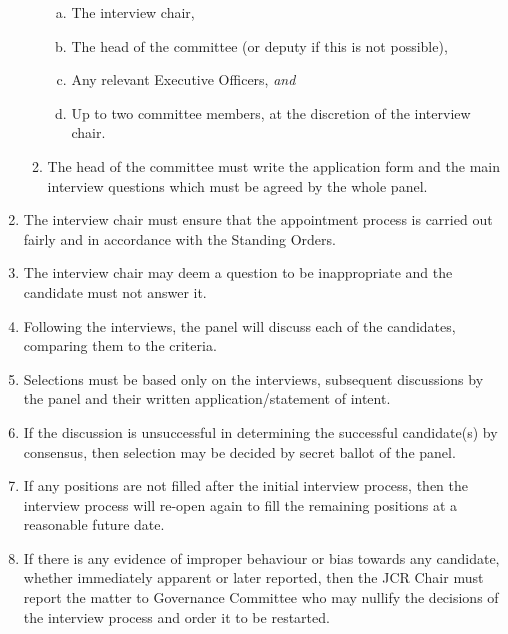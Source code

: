 \documentclass[12pt]{article}
\begin{document}
\begin{enumerate}
\begin{enumerate}
        \begin{enumerate}[(a)]
            \item The interview chair,
            \item The head of the committee (or deputy if this is not possible),
            \item Any relevant Executive Officers, \emph{and}
            \item Up to two committee members, at the discretion of the interview chair.
        \end{enumerate}
        \item The head of the committee must write the application form and the main interview questions which must be agreed by the whole panel.
    \end{enumerate}
    \item The interview chair must ensure that the appointment process is carried out fairly and in accordance with the Standing Orders.
    \item The interview chair may deem a question to be inappropriate and the candidate must not answer it.
    \item Following the interviews, the panel will discuss each of the candidates, comparing them to the criteria.
    \item Selections must be based only on the interviews, subsequent discussions by the panel and their written application/statement of intent.
    \item If the discussion is unsuccessful in determining the successful candidate(s) by consensus, then selection may be decided by secret ballot of the panel.
    \item If any positions are not filled after the initial interview process, then the interview process will re-open again to fill the remaining positions at a reasonable future date.
    \item If there is any evidence of improper behaviour or bias towards any candidate, whether immediately apparent or later reported, then the JCR Chair must report the matter to Governance Committee who may nullify the decisions of the interview process and order it to be restarted.
\end{enumerate}
\newpage
\end{document}
